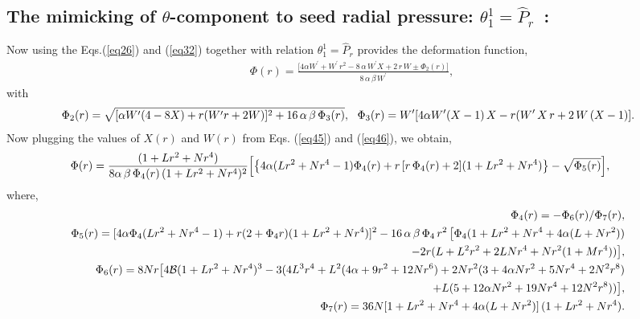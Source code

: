 \documentclass[]{aastex631}
\begin{document}
\subsection{The mimicking of $\theta$-component to seed radial pressure: $\theta^1_1=\hat{P}_r$~:} \label{sec3.2}
Now using the Eqs.(\ref{eq26}) and (\ref{eq32}) together with relation $\theta^1_1=\hat{P}_r$ provides the deformation function, 
\begin{eqnarray}
\Phi(r)=\frac{\big[4 \alpha W^\prime + W^\prime\, r^2 - 8\, \alpha\, W^\prime X + 2\, r\, W \pm \Phi_2(r)\big]}{8\,\alpha\, \beta\, W^\prime} ,  \label{eq54}
\end{eqnarray}
with
\begin{eqnarray}
&&\hspace{-0.6cm} \Phi_2(r)=\sqrt{[\alpha  W^\prime (4 - 8 X) + r ( W^\prime r + 2  W)]^2 +16\, \alpha \,\beta \, \Phi_3(r)},~~ \Phi_3(r)=  W^\prime [4 \alpha W^\prime (X-1)\,X - r ( W^\prime\,X\, r + 2\,W\, (X-1)].\nonumber
\end{eqnarray}
Now plugging the values of $X(r)$ and $W(r)$ from Eqs. (\ref{eq45}) and (\ref{eq46}), we obtain,  
\begin{eqnarray}
&&\hspace{-0.6cm} \Phi(r)=\frac{(1 + L r^2 + N r^4)}{8 \alpha\, \beta\, \Phi_4(r)\, (1 + L r^2 + N r^4)^2} \Big[ \big\{4 \alpha (L r^2 + N r^4-1)\Phi_4(r) + r \,[r\, \Phi_4(r)+2] (1 + L r^2 + N r^4)\big\} - \sqrt{\Phi_5(r)}\Big],~~~~ \label{eq55}
\end{eqnarray}
where,
\begin{eqnarray}
&&\hspace{-0.6cm}\Phi_4(r)=-{\Phi_6(r)}/{\Phi_7(r)},\nonumber\\
&&\hspace{-0.6cm} \Phi_5(r)=[4 \alpha \Phi_4 (L r^2 + N r^4-1) + r (2 + \Phi_4 r) (1 + L r^2 + N r^4)]^2  - 16\, \alpha\, \beta\, \Phi_4\,r^2\, \big[\Phi_4 (1 + L r^2 + N r^4 + 4 \alpha (L + N r^2)) \nonumber\\
&& \hspace{0.4cm} - 2 r (L + L^2 r^2 + 2 L N r^4 + N r^2 (1 + M r^4))\big],\nonumber\\
&&\hspace{-0.6cm} \Phi_6(r) = 8 N r \big[4 \mathcal{B} (1 + L r^2 + N r^4)^3 -  3 (4 L^3 r^4 + L^2 (4 \alpha + 9 r^2 + 12 N r^6) + 2 N r^2 (3 + 4 \alpha N r^2 + 5 N r^4 + 2 N^2 r^8) \nonumber\\
&& \hspace{0.4cm} + 
 L (5 + 12 \alpha N r^2 + 19 N r^4 + 12 N^2 r^8))\big],\nonumber \\
&&\hspace{-0.6cm} \Phi_7(r) =36 N [1 + L r^2 + N r^4 + 4 \alpha (L + N r^2)]\, (1 + L r^2 + N r^4).\nonumber
\end{eqnarray}
\end{document}
